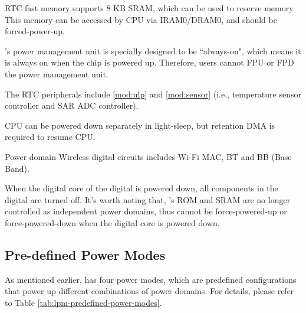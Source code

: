 \documentclass[main\_\_EN.tex]{subfiles}
\begin{document}
\begin{table}[H]
\begin{threeparttable}
\begin{tablenotes}
    \item[2] RTC fast memory supports 8 KB SRAM, which can be used to reserve memory. This memory can be accessed by CPU via IRAM0/DRAM0, and should be forced-power-up.
    \item[3] \chipname{}'s power management unit is specially designed to be ``always-on", which means it is always on when the chip is powered up. Therefore, users cannot FPU or FPD the power management unit.
    \item[4] The RTC peripherals include \ref{mod:ulp} \textit{} and \ref{mod:sensor} \textit{} (i.e., temperature sensor controller and SAR ADC controller).
    \item[5] CPU can be powered down separately in light-sleep, but retention DMA is required to resume CPU.
    \item[6] Power domain Wireless digital circuits includes Wi-Fi MAC, BT and BB (Base Band).
    \item[7] When the digital core of the digital is powered down, all components in the digital are turned off. It's worth noting that, \chipname{}'s ROM and SRAM are no longer controlled as independent power domains, thus cannot be force-powered-up or force-powered-down when the digital core is powered down.
\end{tablenotes}
\end{threeparttable}

\end{table}

\subsection{Pre-defined Power Modes}
As mentioned earlier, \chipname{} has four power modes, which are predefined configurations that power up different combinations of power domains. For details, please refer to Table \ref{tab:lpm-predefined-power-modes}.
\end{document}

